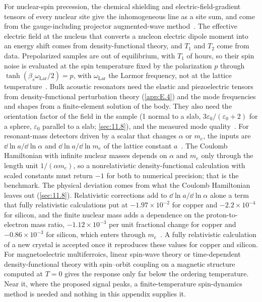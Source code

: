 For nuclear-spin precession, the chemical shielding and electric-field-gradient tensors of every nuclear site give the inhomogeneous line as a site sum, and come from the gauge-including projector augmented-wave method~\cite{pickard2001all}. The effective electric field at the nucleus that converts a nucleon electric dipole moment into an energy shift comes from density-functional theory, and $T_1$ and $T_2$ come from data. Prepolarized samples are out of equilibrium, with $T_1$ of hours, so their spin noise is evaluated at the spin temperature fixed by the polarization $p$ through $\tanh(\beta_s\omega_{\mathrm{Lar}}/2) = p$, with $\omega_{\mathrm{Lar}}$ the Larmor frequency, not at the lattice temperature~\cite{budker2014proposal}. Bulk acoustic resonators need the elastic and piezoelectric tensors from density-functional perturbation theory (\cref{app:E.4}) and the mode frequencies and shapes from a finite-element solution of the body. They also need the orientation factor of the field in the sample (1 normal to a slab, $3\varepsilon_0/(\varepsilon_0 + 2)$ for a sphere, $\varepsilon_0$ parallel to a slab; \cref{sec:11.8}), and the measured mode quality~\cite{trickle2025piezoelectric}. For resonant-mass detectors driven by a scalar that changes $\alpha$ or $m_e$, the inputs are $\dd\ln a/\dd\ln\alpha$ and $\dd\ln a/\dd\ln m_e$ of the lattice constant $a$~\cite{arvanitaki2016sound}. The Coulomb Hamiltonian with infinite nuclear masses depends on $\alpha$ and $m_e$ only through the length unit $1/(\alpha m_e)$, so a nonrelativistic density-functional calculation with scaled constants must return $-1$ for both to numerical precision; that is the benchmark. The physical deviation comes from what the Coulomb Hamiltonian leaves out (\cref{sec:11.8}). Relativistic corrections add to $\dd\ln a/\dd\ln\alpha$ alone a term that fully relativistic calculations put at $-1.97\times10^{-2}$ for copper and $-2.2\times10^{-4}$ for silicon, and the finite nuclear mass adds a dependence on the proton-to-electron mass ratio, $-1.12\times10^{-3}$ per unit fractional change for copper and $-0.86\times10^{-3}$ for silicon, which enters through $m_e$~\cite[Table~II]{pasteka2019material}. A fully relativistic calculation of a new crystal is accepted once it reproduces these values for copper and silicon. For magnetoelectric multiferroics, linear spin-wave theory or time-dependent density-functional theory with spin--orbit coupling on a magnetic structure computed at $T = 0$ gives the response only far below the ordering temperature. Near it, where the proposed signal peaks, a finite-temperature spin-dynamics method is needed and nothing in this appendix supplies it.


